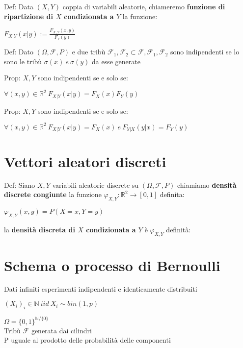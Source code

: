 \documentclass[11pt, letterpaper]{article}
\begin{document}
Def: Data $(X,Y)$ coppia di variabili aleatorie, chiameremo \textbf{funzione di ripartizione di $X$ condizionata a $Y$}
la funzione:
\begin{center}
    $F_{X|Y}(x|y):= \frac{F_{X,Y}(x,y)}{F_{Y}(y)}$
\end{center}

Def: Dato $(\Omega,\mathcal{F},P)$ e due tribù $\mathcal{F}_{1}, \mathcal{F}_{2}\subset\mathcal{F},\mathcal{F}_{1},
\mathcal{F}_{2}$ sono indipendenti se lo sono le tribù $\sigma(x)\ e\ \sigma(y)$ da esse generate 

Prop: $X,Y$ sono indipendenti se e solo se:
\begin{center}
    $\forall(x,y)\in\mathbb{R}^{2}\ F_{X|Y}(x|y)=F_{X}(x)F_{Y}(y)$    
\end{center}

Prop: $X,Y$ sono indipendenti se e solo se:
\begin{center}
    $\forall(x,y)\in\mathbb{R}^{2}\ F_{X|Y}(x|y)=F_{X}(x)\ e\ F_{Y|X}(y|x)=F_{Y}(y)$    
\end{center}

\section{Vettori aleatori discreti}

Def: Siano $X,Y$ variabili aleatorie discrete su $(\Omega,\mathcal{F},P)$ chiamiamo \textbf{densità discrete congiunte}
la funzione $\varphi_{X,Y}:\mathbb{R}^{2}\rightarrow [0,1]$ definita:
\begin{center}
        $\varphi_{X,Y}(x,y)=P(X=x, Y=y)$
\end{center}
la \textbf{densità discreta di $X$ condizionata a $Y$} è  $\varphi_{X,Y}$ definità:

\newpage
\thispagestyle{fancy}
\section{Schema o processo di Bernoulli}

Dati infiniti esperimenti indipendenti e identicamente distribuiti
\begin{center}
    $(X_{i})_{i}\in\mathbb{N}\ iid\ X_{i}\sim bin(1,p)$
\end{center}
$\Omega=\{0,1\}^{\mathbb{N}/\{0\}}$\\
Tribù $\mathcal{F}$ generata dai cilindri\\
P uguale al prodotto delle probabilità delle componenti
\end{document}
